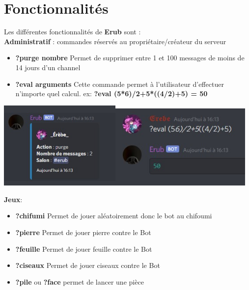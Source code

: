 \section{Fonctionnalités}
Les différentes fonctionnalités de {\bf Erub} sont : \\
{\bf Administratif} : commandes réservés au propriétaire/créateur du serveur
    \begin{itemize}
        \item{\bf ?purge nombre}  Permet de supprimer entre 1 et 100 messages de moins de 14 jours d'un channel
        
        \item{\bf ?eval arguments}  Cette commande permet à l'utilisateur d'effectuer n'importe quel calcul.
        ex: {\bf?eval (5*6)/2+5*((4/2)+5) = 50}
        
    \end{itemize}
    
    \includegraphics[width=6cm]{img/purge.jpg}\includegraphics[width=7cm]{img/eval.jpg}
    
{\bf Jeux}: 
    \begin{itemize}
        \item {\bf ?chifumi} Permet de jouer aléatoirement donc le bot au chifoumi
        \item {\bf ?pierre} Permet de jouer pierre contre le Bot
        \item {\bf ?feuille} Permet de jouer feuille contre le Bot
        \item {\bf ?ciseaux}  Permet de jouer ciseaux contre le Bot
        \item {\bf ?pile} ou {\bf ?face} permet de lancer une pièce
        
    \end{itemize}
    
